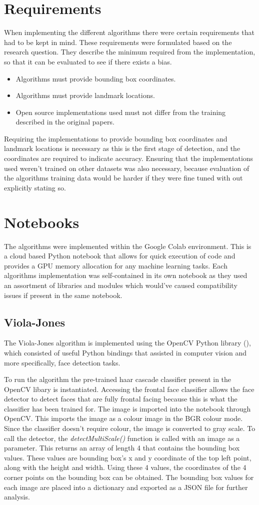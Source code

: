 \documentclass{l4proj}
\begin{document}
\section{Requirements}
When implementing the different algorithms there were certain requirements that had to be kept in mind. These requirements were formulated based on the research question. They describe the minimum required from the implementation, so that it can be evaluated to see if there exists a bias.
\begin{itemize}
  \item Algorithms must provide bounding box coordinates.
  \item Algorithms must provide landmark locations.
  \item Open source implementations used must not differ from the training described in the original papers.
\end{itemize}
Requiring the implementations to provide bounding box coordinates and landmark locations is necessary as this is the first stage of detection, and the coordinates are required to indicate accuracy. Ensuring that the implementations used weren't trained on other datasets was also necessary, because evaluation of the algorithms training data would be harder if they were fine tuned with out explicitly stating so.
\section{Notebooks}
The algorithms were implemented within the Google Colab environment. This is a cloud based Python notebook that allows for quick execution of code and provides a GPU memory allocation for any machine learning tasks. Each algorithms implementation was self-contained in its own notebook as they used an assortment of libraries and modules which would've caused compatibility issues if present in the same notebook.
\subsection{Viola-Jones}
The Viola-Jones algorithm is implemented using the OpenCV Python library (\cite{opencv}), which consisted of useful Python bindings that assisted in computer vision and more specifically, face detection tasks.

To run the algorithm the pre-trained haar cascade classifier present in the OpenCV libary is instantiated. Accessing the frontal face classifier allows the face detector to detect faces that are fully frontal facing because this is what the classifier has been trained for. The image is imported into the notebook through OpenCV. This imports the image as a colour image in the BGR colour mode. Since the classifier doesn't require colour, the image is converted to gray scale. To call the detector, the \textit{detectMultiScale()} function is called with an image as a parameter. This returns an array of length 4 that contains the bounding box values. These values are bounding  box's x and y coordinate of the top left point, along with the height and width. Using these 4 values, the coordinates of the 4 corner points on the bounding box can be obtained. The bounding box values for each image are placed into a dictionary and exported as a JSON file for further analysis.
\end{document}
